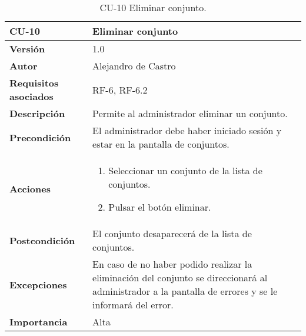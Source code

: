 \begin{table}[p]
	\centering
	\begin{tabularx}{\linewidth}{ p{} p{} }
		\toprule
		\textbf{CU-10}    & \textbf{Eliminar conjunto}\\
		\toprule
		\textbf{Versión}              & 1.0    \\
		\textbf{Autor}                & {Alejandro de Castro} \\
		\textbf{Requisitos asociados} & RF-6, RF-6.2 \\
		\textbf{Descripción}          & Permite al administrador eliminar un conjunto. \\
		\textbf{Precondición}         & El administrador debe haber iniciado sesión y estar en la pantalla de conjuntos. \\
        \textbf{Acciones}             &
		\begin{enumerate}
			\def\labelenumi{\arabic{enumi}.}
			\tightlist
            \item Seleccionar un conjunto de la lista de conjuntos.
			\item Pulsar el botón eliminar.
		\end{enumerate}\\ 
		\textbf{Postcondición}        & El conjunto desaparecerá de la lista de conjuntos. \\
		\textbf{Excepciones}          & En caso de no haber podido realizar la eliminación del conjunto se direccionará al administrador a la pantalla de errores y se le informará del error. \\
		\textbf{Importancia}          & Alta \\
		\bottomrule
	\end{tabularx}
	\caption{CU-10 Eliminar conjunto.}
\end{table}

